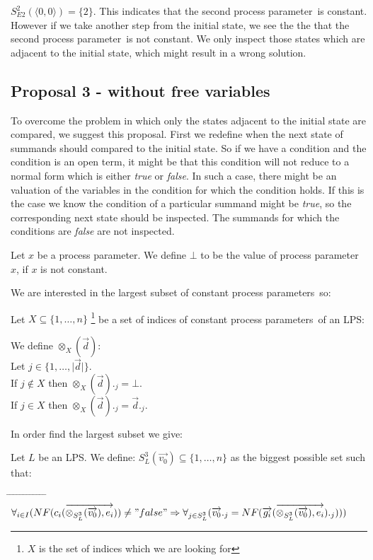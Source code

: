 \index{}\documentclass[a4paper,10pt]{article}
\theoremstyle{plain}
\theoremstyle{definition}
\newcommand{\ovr}{\overrightarrow}
\newcommand{\pp}{process parameter}
\newcommand{\pps}{process parameters}
\newcommand{\ti}{\textit}
\newcommand{\tab}{\hspace*{5.mm} \= \hspace*{5.mm} \= \hspace*{5.mm} \= \hspace*{5.mm} \= \hspace*{5.mm} \= \hspace*{5.mm}  \= \hspace*{5.mm}  \= \hspace*{5.mm}  \= \hspace*{5.mm} \= \hspace*{5.mm} \= \hspace*{5.mm}  \= \hspace*{5.mm}  \= \hspace*{5.mm}\kill}
\begin{document}
\begin{defn}
$S_{E2}^2(\langle 0,0 \rangle) = \lbrace 2 \rbrace$. This indicates that the second \pp\ is constant. However if we take another step from the initial state, we see the the that the second \pp\ is not constant. We only inspect those states which are adjacent to the initial state, which might result in a wrong solution.
\end{defn}

\subsection{Proposal 3 - without free variables}
To overcome the problem in which only the states adjacent to the initial state are compared, we suggest this proposal. First we redefine when the next state of summands should compared to the initial state. So if we have a condition and the condition is an open term, it might be that this condition will not reduce to a normal form which is either \ti{true} or \ti{false}. In such a case, there might be an valuation of the variables in the condition for which the condition holds. If this is the case we know the condition of a particular summand might be \ti{true}, so the corresponding next state should be inspected. The summands for which the conditions are \ti{false} are not inspected. \\

\begin{defn}[$\bot$] Let $x$ be a \pp . We define $\bot$ to be the value of \pp\ $x$, if $x$ is not constant. 
\end{defn}

We are interested in the largest subset of constant \pps\ so:

Let $X \subseteq \lbrace 1, \ldots, n \rbrace$ \footnote{$X$ is the set of indices which we are looking for} be a set of indices of constant \pps\ of an LPS:

\begin{defn} We define $\otimes_X(\ovr{d})$:\\
Let $j \in \lbrace 1, \dots, \vert \ovr{d} \vert \rbrace $. \\
If $j \not\in X$ then $\otimes_X(\ovr{d})._j = \bot $. \\
If $j \in X$ then $\otimes_X(\ovr{d})._j = \ovr{d}._j$.\\
\end{defn}

In order find the largest subset we give:

\begin{defn} \label{def:sug3} Let $L$ be an LPS. We define: $ S_L^3(\ovr{v_0}) \subseteq \lbrace 1, \ldots, n \rbrace $ 
 as the biggest possible set such that:\\ 
\begin{tabbing}
\tab
\> $\forall_{i \in I} (NF( c_i ( \ovr{\otimes_{S_L^3}(\ovr{v_0}), e_i} ) ) \not= "false" \Rightarrow \forall_{j \in S_L^3}(\ovr{v_0}._j =  NF( \ovr{g_i}(\ovr{\otimes_{S_L^3}(\ovr{v_0}), e_i} )._j))) $
\end{tabbing}
\end{defn}
\end{document}
